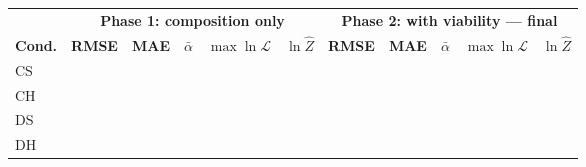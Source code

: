\begin{tabular}{@{}l ccccc ccccc@{}}
\toprule
& \multicolumn{5}{c}{\textbf{Phase 1: composition only}} & \multicolumn{5}{c}{\textbf{Phase 2: with viability --- final}}\\
\cmidrule(lr){2-6}\cmidrule(lr){7-11}
\textbf{Cond.} & \textbf{RMSE} & \textbf{MAE} & $\bar{\alpha}$ & $\max\ln\mathcal{L}$ & $\ln\hat{Z}$ & \textbf{RMSE} & \textbf{MAE} & $\bar{\alpha}$ & $\max\ln\mathcal{L}$ & $\ln\hat{Z}$\\
\midrule
CS & \TBD{} & \TBD{} & \TBD{} & \TBD{} & \TBD{} & \TBD{} & \TBD{} & \TBD{} & \TBD{} & \TBD{}\\
CH & \TBD{} & \TBD{} & \TBD{} & \TBD{} & \TBD{} & \TBD{} & \TBD{} & \TBD{} & \TBD{} & \TBD{}\\
DS & \TBD{} & \TBD{} & \TBD{} & \TBD{} & \TBD{} & \TBD{} & \TBD{} & \TBD{} & \TBD{} & \TBD{}\\
DH & \TBD{} & \TBD{} & \TBD{} & \TBD{} & \TBD{} & \TBD{} & \TBD{} & \TBD{} & \TBD{} & \TBD{}\\
\bottomrule
\end{tabular}
